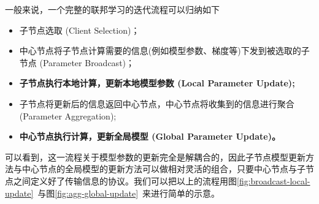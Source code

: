 

一般来说，一个完整的联邦学习的迭代流程可以归纳如下
\begin{itemize}
    \item 子节点选取 (Client Selection)；
    \item 中心节点将子节点计算需要的信息(例如模型参数、梯度等)下发到被选取的子节点 (Parameter Broadcast)；
    \item {\bfseries 子节点执行本地计算，更新本地模型参数 (Local Parameter Update);}
    \item 子节点将更新后的信息返回中心节点，中心节点将收集到的信息进行聚合 (Parameter Aggregation);
    \item {\bfseries 中心节点执行计算，更新全局模型 (Global Parameter Update)。}
\end{itemize}
可以看到，这一流程关于模型参数的更新完全是解耦合的，因此子节点模型更新方法与中心节点的全局模型的更新方法可以做相对灵活的组合，只要中心节点与子节点之间定义好了传输信息的协议。我们可以把以上的流程用图\ref{fig:broadcast-local-update}~与图\ref{fig:agg-global-update}~来进行简单的示意。


